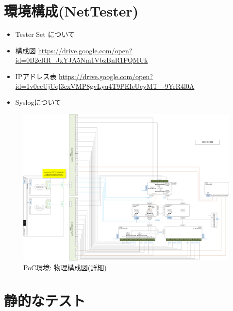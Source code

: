 \section{環境構成(NetTester)}

\begin{itemize}
 \item Tester Set について
 \item 構成図 \url{https://drive.google.com/open?id=0B2eRR_JxYJA5Nm1VbzBnR1FQMUk}
 \item IPアドレス表 \url{https://drive.google.com/open?id=1v0ecUjUql3cxVMP8gvLyq4T9PEIeUeyMT_-9YrR4l0A}
 \item Syslogについて
\end{itemize}

\begin{landscape}
 \begin{figure}[h]
  \centering
  \includegraphics[scale=0.225]{img/poc-env-physical-detail.png}
  \caption{PoC環境: 物理構成図(詳細)}
  \label{fig:poc-env-physical-detail}
 \end{figure}
\end{landscape}

\section{静的なテスト}



